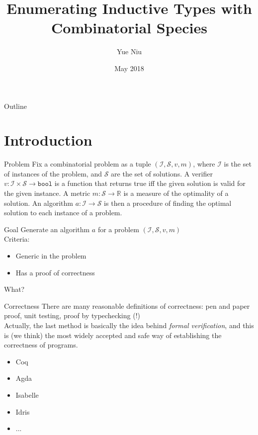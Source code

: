 \documentclass{beamer}
\title{Enumerating Inductive Types with Combinatorial Species}
\subtitle{}
\author{Yue Niu}
\institute[Carnegie Mellon University] %
{
  \inst{1}%
  Department of Computer Science\\
	Carnegie Mellon University
}
\date{May 2018}
\newcommand{\irl}[1]{\mathtt{#1}}
\begin{document}
\begin{frame}
  \titlepage
\end{frame}

\begin{frame}{Outline}
  \tableofcontents
\end{frame}

\section{Introduction}

\begin{frame}{Problem}
Fix a combinatorial problem as a tuple $(\mathcal{I},\mathcal{S},v,m)$, 
where $\mathcal{I}$ is the set of instances 
of the problem, and $\mathcal{S}$ are the set of solutions. A verifier 
$v : \mathcal{I} \times \mathcal{S} \to \irl{bool}$ is a function that returns true iff the given solution 
is valid for the given instance.  
A metric $m : \mathcal{S} \to \mathbb{R}$ is a measure of the optimality of a solution. 
An algorithm $a : \mathcal{I} \to \mathcal{S}$ is then a procedure of finding the optimal solution 
to each instance of a problem.
\end{frame}

\begin{frame}{Goal}
Generate an algorithm $a$ for a problem $(\mathcal{I},\mathcal{S},v,m)$\\
Criteria:
\begin{itemize}
\item Generic in the problem
\item Has a proof of correctness
\end{itemize}

What?
\end{frame}

\begin{frame}{Correctness}
There are many reasonable definitions of correctness: pen and paper proof, unit testing, 
proof by typechecking (!)\\

Actually, the last method is basically the idea behind \emph{formal verification}, and this is (we think)
the most widely accepted and safe way of establishing the correctness of programs.
\begin{itemize}
\item Coq
\item Agda
\item Isabelle
\item Idris
\item ...
\end{itemize}
\end{frame}
\end{document}
